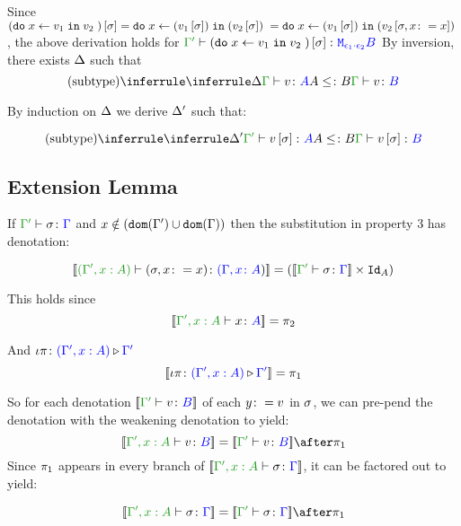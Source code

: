 \documentclass{report}
\begin{document}
    Since $(\texttt{do}\; x \leftarrow v_1 \;\texttt{in}\; v_2\;)\left[\sigma\right] = \texttt{do}\; x \leftarrow (v_1\left[\sigma\right]) \;\texttt{in}\; (v_2\left[\sigma\right])\; = \texttt{do}\; x \leftarrow (v_1\left[\sigma\right]) \;\texttt{in}\; (v_2\left[\sigma, x\colon= x\right])\;$, the above derivation holds for $\typerelation{\G'}{(\doin{x}{v_1}{v_2})\ssi}{\M{\e_1\dot\e_2}{B}}$
    By inversion, there exists $\Delta$ such that
    \begin{equation}
        \ntreeruleII{subtype}{\treeruleI{\D}{\typerelation{\G}{v}{A}}}{ A\subtype B}{\typerelation{\G}{v}{B}}
    \end{equation}

    By induction on $\Delta$ we derive $\Delta'$ such that:

    \begin{equation}
        \ntreeruleII{subtype}{\treeruleI{\D'}{\typerelation{\G'}{v\ssi}{A}}}{ A\subtype B}{\typerelation{\G}{v\ssi}{B}}
    \end{equation}
\subsection{Extension Lemma}
If $\typerelation{\G'}{\si}{\G}$ and $x\notin(\texttt{dom}(\Gamma')\cup\texttt{dom}(\Gamma))$ then the substitution in property 3 has denotation:

\begin{equation}
    \deno{\typerelation{(\G', x:A)}{(\si, x\setto x)}{(\gax})} = (\deno{\typerelation{\G'}{\si}{\G}}\times \Id{A})
\end{equation}

This holds since 
\begin{equation}
    \deno{\typerelation{\G', x:A}{x}{A}} = \pp
\end{equation}

And $\iota\pi \colon {\color{blue}(\Gamma',x:A)} \triangleright {\color {blue} \Gamma'}$
\begin{equation}
    {\bf [\![}\iota\pi \colon {\color{blue}(\Gamma',x:A)} \triangleright {\color {blue} \Gamma'}{\bf ]\!]} = \pi_1
\end{equation}

So for each denotation $\deno{\typerelation{\G'}{v}{B}}$ of each $y\colon= v$ in $\sigma$, we can pre-pend the denotation with the weakening denotation to yield: 
\begin{equation}
    \deno{\typerelation{\G',x:A}{v}{B}} = \deno{\typerelation{\G'}{v}{B}}\after\p
\end{equation}
Since $\pi_1$ appears in every branch of $\deno{\typerelation{\G', x:A}{\si}{\G}}$, it can be factored out to yield:

\begin{equation}
    \deno{\typerelation{\G', x:A}{\si}{\G}} = \deno{\typerelation{\G'}{\si}{\G}}\after\p
\end{equation}
\end{document}
